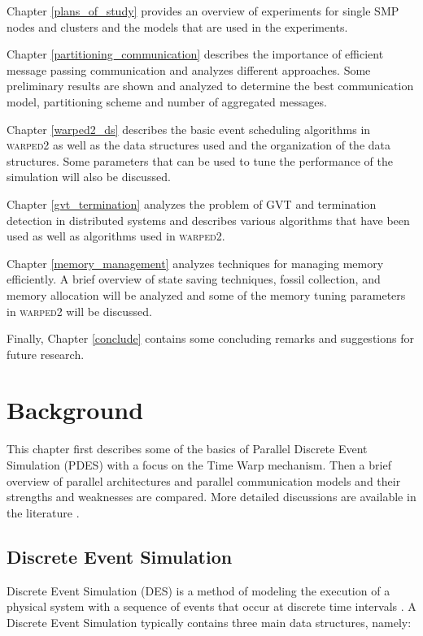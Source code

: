 \documentclass[11pt]{book}
\begin{document}
Chapter \ref{plans_of_study} provides an overview of experiments for single SMP nodes and
clusters and the models that are used in the experiments.

Chapter \ref{partitioning_communication} describes the importance of efficient message
passing communication and analyzes different approaches.  Some preliminary results are
shown and analyzed to determine the best communication model, partitioning scheme and
number of aggregated messages.

Chapter \ref{warped2_ds} describes the basic event scheduling algorithms in
\textsc{warped2} as well as the data structures used and the organization of the data
structures.  Some parameters that can be used to tune the performance of the simulation
will also be discussed.

Chapter \ref{gvt_termination} analyzes the problem of GVT and termination detection in
distributed systems and describes various algorithms that have been used as well as
algorithms used in \textsc{warped2}.

Chapter \ref{memory_management} analyzes techniques for managing memory efficiently.  A
brief overview of state saving techniques, fossil collection, and memory allocation will
be analyzed and some of the memory tuning parameters in \textsc{warped2} will be
discussed.

Finally, Chapter \ref{conclude} contains some concluding remarks and suggestions for
future research.


\chapter{Background}\label{background}

This chapter first describes some of the basics of Parallel Discrete Event Simulation (PDES) with a
focus on the Time Warp mechanism.  Then a brief overview of parallel architectures and parallel
communication models and their strengths and weaknesses are compared.  More detailed discussions are
available in the literature \cite{fujimoto-90,fujimoto-00}.

\section{Discrete Event Simulation}

Discrete Event Simulation (DES) is a method of modeling the execution of a physical system with a
sequence of events that occur at discrete time intervals \cite{law-00}.  A Discrete Event Simulation
typically contains three main data structures, namely:
\end{document}
